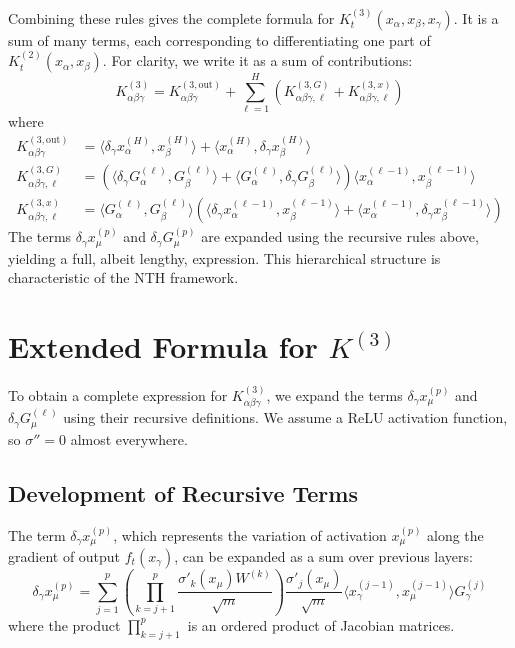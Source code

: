 \documentclass[11pt,a4paper]{article}
\theoremstyle{definition}
\begin{document}
Combining these rules gives the complete formula for $K^{(3)}_t(x_\alpha, x_\beta, x_\gamma)$. It is a sum of many terms, each corresponding to differentiating one part of $K^{(2)}_t(x_\alpha, x_\beta)$. For clarity, we write it as a sum of contributions:
\begin{equation}
K^{(3)}_{\alpha\beta\gamma} = K^{(3, \text{out})}_{\alpha\beta\gamma} + \sum_{\ell=1}^H \left( K^{(3, G)}_{\alpha\beta\gamma, \ell} + K^{(3, x)}_{\alpha\beta\gamma, \ell} \right)
\end{equation}
where
\begin{align}
K^{(3, \text{out})}_{\alpha\beta\gamma} &= \langle \delta_\gamma x^{(H)}_\alpha, x^{(H)}_\beta \rangle + \langle x^{(H)}_\alpha, \delta_\gamma x^{(H)}_\beta \rangle \\
K^{(3, G)}_{\alpha\beta\gamma, \ell} &= \left( \langle \delta_\gamma G^{(\ell)}_\alpha, G^{(\ell)}_\beta \rangle + \langle G^{(\ell)}_\alpha, \delta_\gamma G^{(\ell)}_\beta \rangle \right) \langle x^{(\ell-1)}_\alpha, x^{(\ell-1)}_\beta \rangle \\
K^{(3, x)}_{\alpha\beta\gamma, \ell} &= \langle G^{(\ell)}_\alpha, G^{(\ell)}_\beta \rangle \left( \langle \delta_\gamma x^{(\ell-1)}_\alpha, x^{(\ell-1)}_\beta \rangle + \langle x^{(\ell-1)}_\alpha, \delta_\gamma x^{(\ell-1)}_\beta \rangle \right)
\end{align}
The terms $\delta_\gamma x^{(p)}_\mu$ and $\delta_\gamma G^{(p)}_\mu$ are expanded using the recursive rules above, yielding a full, albeit lengthy, expression. This hierarchical structure is characteristic of the NTH framework.


\section{Extended Formula for $K^{(3)}$}

To obtain a complete expression for $K^{(3)}_{\alpha\beta\gamma}$, we expand the terms $\delta_\gamma x^{(p)}_\mu$ and $\delta_\gamma G^{(\ell)}_\mu$ using their recursive definitions. We assume a ReLU activation function, so $\sigma''=0$ almost everywhere.

\subsection{Development of Recursive Terms}

The term $\delta_\gamma x^{(p)}_\mu$, which represents the variation of activation $x^{(p)}_\mu$ along the gradient of output $f_t(x_\gamma)$, can be expanded as a sum over previous layers:
\begin{equation}
\delta_\gamma x^{(p)}_\mu = \sum_{j=1}^{p} \left( \prod_{k=j+1}^{p} \frac{\sigma'_{k}(x_\mu) W^{(k)}}{\sqrt{m}} \right) \frac{\sigma'_{j}(x_\mu)}{\sqrt{m}} \langle x^{(j-1)}_\gamma, x^{(j-1)}_\mu \rangle G^{(j)}_\gamma
\end{equation}
where the product $\prod_{k=j+1}^{p}$ is an ordered product of Jacobian matrices.
\end{document}

